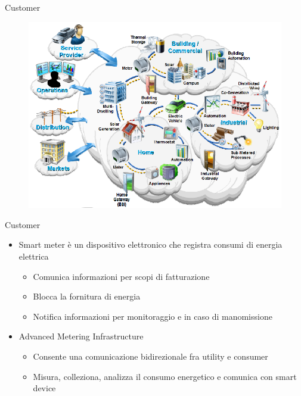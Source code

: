 

\begin{frame}[fragile]{Customer} 
	\begin{figure}[h] 
		\includegraphics[scale=0.45]{imgs/cust.png}
	\end{figure}
\end{frame}

\begin{frame}[fragile]{Customer} 
	\begin{itemize}[<+- | alert@+>]
		\item Smart meter è un dispositivo elettronico che registra consumi di energia elettrica
		\begin{itemize}
			\item Comunica informazioni per scopi di fatturazione
			\item Blocca la fornitura di energia  %
			\item Notifica informazioni per monitoraggio e in caso di manomissione %
		\end{itemize}		 
		\item Advanced Metering Infrastructure  %
		\begin{itemize}
			\item Consente una comunicazione bidirezionale fra utility e consumer %
			\item Misura, colleziona, analizza il consumo energetico e comunica con smart device
		\end{itemize}			
	\end{itemize}
\end{frame}

